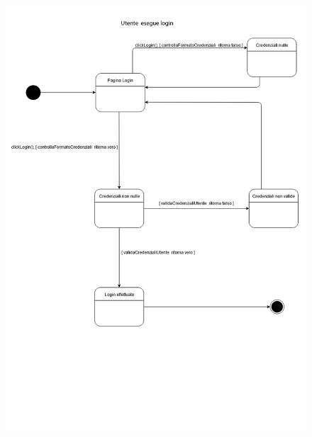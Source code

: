 \begin{figure}[h!]
    \includegraphics[width=\textwidth]{SequenceAnalisi/8.png}
\end{figure}
\pagebreak
